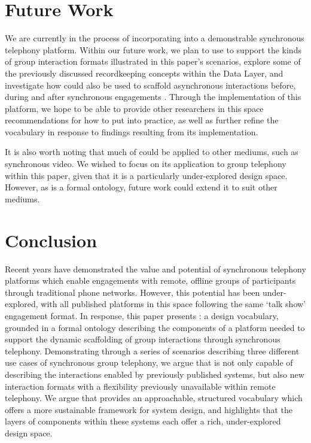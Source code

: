 \section{Future Work}

We are currently in the process of incorporating \ONT{} into a demonstrable synchronous telephony platform. Within our future work, we plan to use \ONT{} to support the kinds of group interaction formats illustrated in this paper's scenarios, explore some of the previously discussed recordkeeping concepts within the Data Layer, and investigate how \ONT{} could also be used to scaffold asynchronous interactions before, during and after synchronous engagements \cite{Yadav2017}. Through the implementation of this platform, we hope to be able to provide other researchers in this space recommendations for how to put \ONT{} into practice, as well as further refine the vocabulary in response to findings resulting from its implementation.

It is also worth noting that much of \ONT{} could be applied to other mediums, such as synchronous video. We wished to focus on its application to group telephony within this paper, given that it is a particularly under-explored design space. However, as \ONT{} is a formal ontology, future work could extend it to suit other mediums.

\section{Conclusion}

Recent years have demonstrated the value and potential of synchronous telephony platforms which enable engagements with remote, offline groups of participants through traditional phone networks. However, this potential has been under-explored, with all published platforms in this space following the same `talk show' engagement format. In response, this paper presents \ONT{}: a design vocabulary, grounded in a formal ontology describing the components of a platform needed to support the dynamic scaffolding of group interactions through synchronous telephony. Demonstrating through a series of scenarios describing three different use cases of synchronous group telephony, we argue that \ONT{} is not only capable of describing the interactions enabled by previously published systems, but also new interaction formats with a flexibility previously unavailable within remote telephony. We argue that \ONT{} provides an approachable, structured vocabulary which offers a more sustainable framework for system design, and highlights that the layers of components within these systems each offer a rich, under-explored design space.